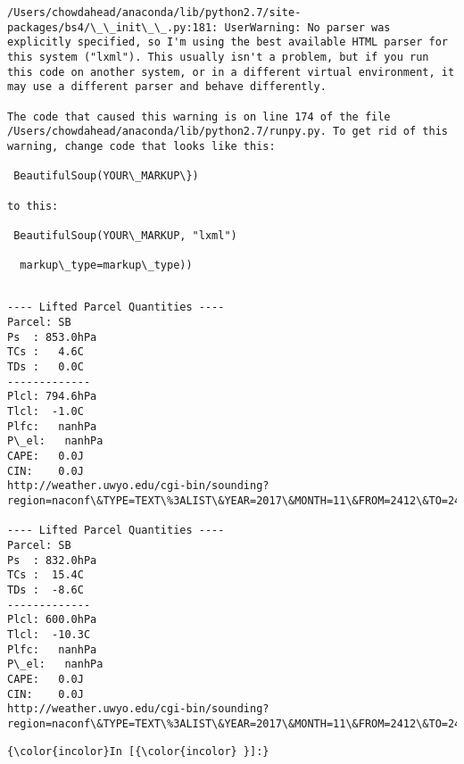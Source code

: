 \documentclass[11pt]{article}
\begin{document}
    \begin{Verbatim}[commandchars=\\\{\}]
/Users/chowdahead/anaconda/lib/python2.7/site-packages/bs4/\_\_init\_\_.py:181: UserWarning: No parser was explicitly specified, so I'm using the best available HTML parser for this system ("lxml"). This usually isn't a problem, but if you run this code on another system, or in a different virtual environment, it may use a different parser and behave differently.

The code that caused this warning is on line 174 of the file /Users/chowdahead/anaconda/lib/python2.7/runpy.py. To get rid of this warning, change code that looks like this:

 BeautifulSoup(YOUR\_MARKUP\})

to this:

 BeautifulSoup(YOUR\_MARKUP, "lxml")

  markup\_type=markup\_type))

    \end{Verbatim}

    \begin{Verbatim}[commandchars=\\\{\}]

---- Lifted Parcel Quantities ----
Parcel: SB
Ps  : 853.0hPa
TCs :   4.6C
TDs :   0.0C
-------------
Plcl: 794.6hPa
Tlcl:  -1.0C
Plfc:   nanhPa
P\_el:   nanhPa
CAPE:   0.0J
CIN:    0.0J
http://weather.uwyo.edu/cgi-bin/sounding?region=naconf\&TYPE=TEXT\%3ALIST\&YEAR=2017\&MONTH=11\&FROM=2412\&TO=2412\&STNM=72476

---- Lifted Parcel Quantities ----
Parcel: SB
Ps  : 832.0hPa
TCs :  15.4C
TDs :  -8.6C
-------------
Plcl: 600.0hPa
Tlcl:  -10.3C
Plfc:   nanhPa
P\_el:   nanhPa
CAPE:   0.0J
CIN:    0.0J
http://weather.uwyo.edu/cgi-bin/sounding?region=naconf\&TYPE=TEXT\%3ALIST\&YEAR=2017\&MONTH=11\&FROM=2412\&TO=2412\&STNM=72469

    \end{Verbatim}

    \begin{Verbatim}[commandchars=\\\{\}]
{\color{incolor}In [{\color{incolor} }]:} 
\end{Verbatim}


    
    
    
    
\end{document}
